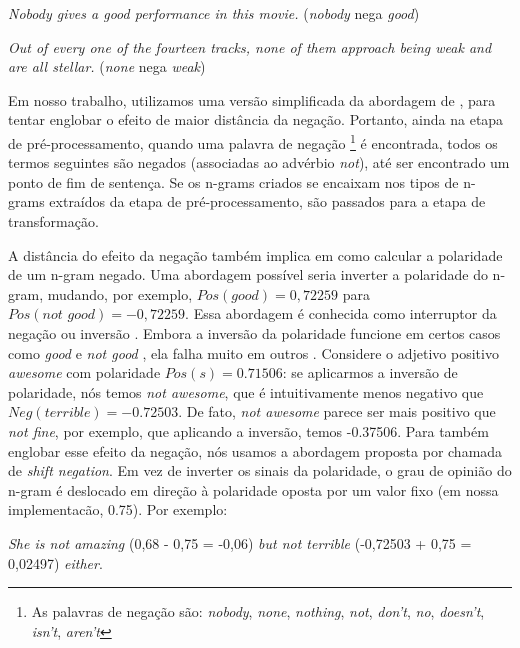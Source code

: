\begin{example}
\textit{Nobody gives a good performance in this movie.} (\textit{nobody} nega \textit{good})
\label{ex:far_neg_1}
\end{example}

\begin{example}
\textit{Out of every one of the fourteen tracks, none of them approach being weak and are all stellar.} (\textit{none} nega \textit{weak})
\label{ex:far_neg_2}
\end{example}

Em nosso trabalho, utilizamos uma versão simplificada da abordagem de , para tentar englobar o efeito de maior distância da negação. Portanto, ainda na etapa de pré-processamento, quando uma palavra de negação \footnote{As palavras de negação são: \textit{nobody}, \textit{none}, \textit{nothing}, \textit{not}, \textit{don't}, \textit{no}, \textit{doesn't}, \textit{isn't}, \textit{aren't}} é encontrada, todos os termos seguintes são negados (associadas ao advérbio \textit{not}), até ser encontrado um ponto de fim de sentença. Se os n-grams criados se encaixam nos tipos de n-grams extraídos da etapa de pré-processamento, são passados para a etapa de transformação. 

A distância do efeito da negação também implica em como calcular a polaridade de um n-gram negado.  Uma abordagem possível seria inverter a polaridade do n-gram, mudando, por exemplo, $Pos(\textit{good}) = 0,72259$ para $Pos(\textit{not good}) = - 0,72259$. Essa abordagem é conhecida como interruptor da negação ou inversão \cite{sauri2008factuality}. Embora a inversão da polaridade funcione em certos casos como \textit{good} e \textit{not good} \cite{choi2008learning}, ela falha muito em outros \cite{liu2009review}. Considere o adjetivo positivo \textit{awesome} com polaridade $Pos(s) = 0.71506 $: se aplicarmos a inversão de polaridade, nós temos \textit{not awesome}, que é intuitivamente menos negativo que $Neg(\textit{terrible}) = -0.72503$. De fato, \textit{not awesome} parece ser mais positivo que \textit{not fine}, por exemplo, que aplicando a inversão, temos -0.37506. Para também englobar esse efeito da negação, nós usamos a abordagem proposta por  chamada de \textit{shift negation}. Em vez de inverter os sinais da polaridade, o grau de opinião do n-gram é deslocado em direção à polaridade oposta por um valor fixo (em nossa implementacão, 0.75). Por exemplo:

\begin{example}
\textit{She is not amazing} (0,68 - 0,75 = -0,06) \textit{but not terrible} (-0,72503 + 0,75 = 0,02497) \textit{either}.
\label{ex:shift_1}
\end{example}

